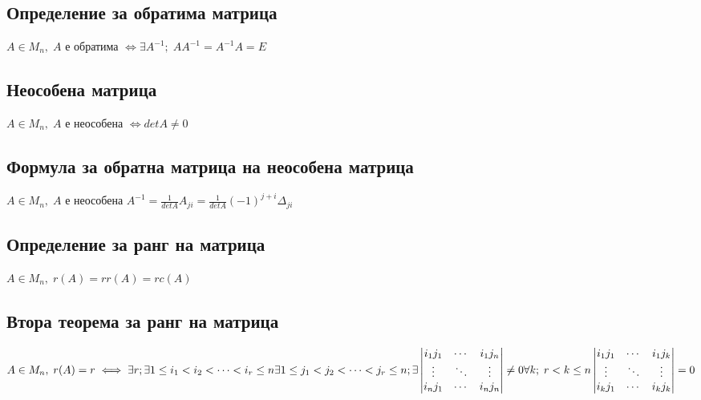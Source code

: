 \documentclass{article}
\begin{document}
    \section{}
    \subsection{Определение за обратима матрица}
    \(A \in M_n, \; A \text{ е обратима } \iff \exists A^{-1}; \; AA^{-1} = A^{-1}A = E\)
    \subsection{Неособена матрица}
    \(A \in M_n, \; A \text{ е неособена } \iff detA \neq 0\)
    \subsection{Формула за обратна матрица на неособена матрица}
    \(A \in M_n, \; A \text{ е неособена } A^{-1} = \frac{1}{detA} A_{ji} = \frac{1}{detA} (-1)^{j + i}\Delta_{ji}\)
    \subsection{Определение за ранг на матрица}
    \(A \in M_n, \; r(A) = rr(A) = rc(A)\)
    \subsection{Втора теорема за ранг на матрица}
    \(A \in M_n, \; r(A) = r \iff \exists r;\\
    \exists 1 \leq i_1 < i_2 < \dots < i_r \leq n\\
    \exists 1 \leq j_1 < j_2 < \dots < j_r \leq n;\\
    \exists \begin{vmatrix}
        i_1j_1 & \cdots & i_1j_n\\
        \vdots & \ddots & \vdots\\
        i_nj_1 & \cdots & i_nj_n
    \end{vmatrix} \neq 0\\
    \forall k; \; r < k \leq n \begin{vmatrix}
        i_1j_1 & \cdots & i_1j_k\\
        \vdots & \ddots & \vdots\\
        i_kj_1 & \cdots & i_kj_k
    \end{vmatrix} = 0\)
    \section{}
\end{document}
